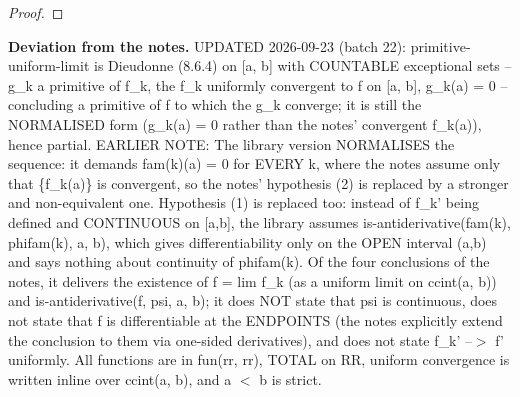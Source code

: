 \begin{proof}
%
%
%
%
%
%
\end{proof}
%
\noindent\textbf{Deviation from the notes.} UPDATED 2026-09-23 (batch 22): primitive-uniform-limit is Dieudonne (8.6.4) on [a, b] with COUNTABLE exceptional sets -- g\_k a primitive of f\_k, the f\_k uniformly convergent to f on [a, b], g\_k(a) = 0 -- concluding a primitive of f to which the g\_k converge; it is still the NORMALISED form (g\_k(a) = 0 rather than the notes' convergent f\_k(a)), hence partial. EARLIER NOTE: The library version NORMALISES the sequence: it demands fam(k)(a) = 0 for EVERY k, where the notes assume only that \{f\_k(a)\} is convergent, so the notes' hypothesis (2) is replaced by a stronger and non-equivalent one. Hypothesis (1) is replaced too: instead of f\_k' being defined and CONTINUOUS on [a,b], the library assumes is-antiderivative(fam(k), phifam(k), a, b), which gives differentiability only on the OPEN interval (a,b) and says nothing about continuity of phifam(k). Of the four conclusions of the notes, it delivers the existence of f = lim f\_k (as a uniform limit on ccint(a, b)) and is-antiderivative(f, psi, a, b); it does NOT state that psi is continuous, does not state that f is differentiable at the ENDPOINTS (the notes explicitly extend the conclusion to them via one-sided derivatives), and does not state f\_k' --$>$ f' uniformly. All functions are in fun(rr, rr), TOTAL on RR, uniform convergence is written inline over ccint(a, b), and a $<$ b is strict.
%
\renewcommand{\thethm}{4.17}
